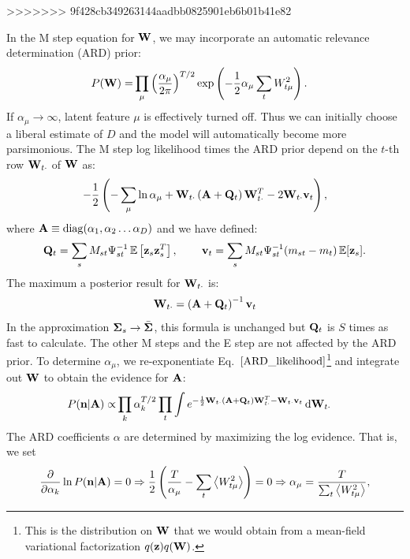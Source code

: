 \documentclass[nofootinbib,amssymb,amsmath]{revtex4}
\newcommand{\ave}[1]{\left\langle #1 \right\rangle}
\newcommand{\vv}{{\bf v}}
\newcommand{\vz}{{\bf z}}
\newcommand{\vn}{{\bf n}}
\newcommand{\vQ}{{\bf Q}}
\newcommand{\vW}{{\bf W}}
\newcommand{\vSigma}{{\bf \Sigma}}
\newcommand{\vA}{{\bf A}}
\newcommand{\EE}{\mathbb{E}}
\begin{document}
>>>>>>> 9f428cb349263144aadbb0825901eb6b01b41e82

In the M step equation for $\vW$, we may incorporate an automatic relevance determination (ARD) prior:
%
\begin{align}
P(\vW) =& \prod_\mu \left( \frac{\alpha_\mu}{2 \pi} \right)^{T/2} \exp \left( -\frac{1}{2} \alpha_\mu \sum_t W_{t\mu}^2  \right).
\end{align}
%
If $\alpha_\mu \rightarrow \infty$, latent feature $\mu$ is effectively turned off. Thus we can initially choose a liberal estimate of $D$ and the model will automatically become more parsimonious. The M step log likelihood times the ARD prior depend on the $t$-th row $\vW_{t \cdot}$ of $\vW$ as:
%
\begin{equation*}
 -\frac{1}{2}   \left( -\sum_\mu \ln \alpha_\mu  + \vW_{t \cdot} \left(\vA +  \vQ_t  \right) \vW_{t \cdot}^T - 2 \vW_{t \cdot} \vv_t  \right),
 \label{ARD_likelihood}
\end{equation*}
%
where $\vA \equiv {\rm diag}(\alpha_1, \alpha_2 \ldots \alpha_D)$ and we have defined:
%
\begin{equation}
\vQ_t = \sum_s M_{st} \Psi_{st}^{-1} \, \EE\left[\vz_s \vz_s^T\right], \, \qquad \vv_t = \sum_s M_{st} \Psi_{st}^{-1} (m_{st} - m_t)\, \EE[\vz_s].
\end{equation}
%
The maximum a posterior result for $\vW_{t \cdot}$ is:
%
\begin{equation}
\vW_{t \cdot} = \left(  \vA + \vQ_t \right)^{-1} \vv_t
\label{M_step_W}
\end{equation}
%
In the approximation $\vSigma_s \rightarrow \bar{\vSigma}$, this formula is unchanged but $\vQ_t$ is $S$ times as fast to calculate. The other M steps and the E step are not affected by the ARD prior. To determine $\alpha_\mu$, we re-exponentiate Eq.~$\eqref{ARD_likelihood}$\footnote{This is the distribution on $\vW$ that we would obtain from a mean-field variational factorization $q(\vz) q(\vW)$.} and integrate out $\vW$ to obtain the evidence for $\vA$:
%
\begin{align}
P(\vn | \vA) \propto& \prod_k \alpha_k^{T/2} \prod_t \int e^{-\frac{1}{2} \vW_{t \cdot} (\vA + \vQ_t) \vW_{t \cdot}^T - \vW_{t \cdot} \vv_t} \, \mathrm{d} \vW_{t \cdot}
\label{ARD_evidence}
\end{align}
%
The ARD coefficients $\alpha$ are determined by maximizing the log evidence.  That is, we set
\begin{align}
\frac{\partial}{\partial \alpha_k} \ln P(\vn | \vA) = 0 \Rightarrow  \frac{1}{2} \left( \frac{T}{\alpha_\mu}  - \sum_t \ave{W_{t\mu}^2} \right) = 0 \Rightarrow \alpha_\mu = \frac{T}{\sum_t \ave{W_{t\mu}^2}},
\end{align}
\end{document}
